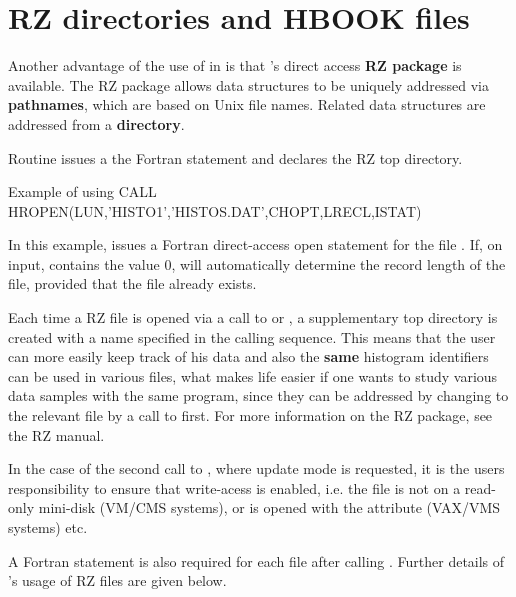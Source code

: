 \newpage
{}
\section{RZ directories and HBOOK files}
%

Another advantage of the use of \ZEBRA{} in \HBOOK{} is that \ZEBRA{}'s direct
access {\bf RZ package} is available.
The RZ package allows data structures to
%
be uniquely addressed via {\bf pathnames}, which are based on
Unix file names.  
Related data structures are addressed from a {\bf directory}. 

Routine  issues a 
the Fortran  statement and declares the
RZ top directory.

\begin{XMPt}{Example of using \protect{}}
      CALL HROPEN(LUN,'HISTO1','HISTOS.DAT',CHOPT,LRECL,ISTAT)
\end{XMPt}

In this example,  issues a Fortran direct-access open
statement for the file . 
If, on input,  contains the value 0,  will
automatically determine the record length of the file, provided
that the file already exists.

Each time a RZ file is opened via a
%
call to  or ,
a supplementary top directory is created with
a name specified in the calling sequence. This
means that the user can more easily keep track of his data
and also the {\bf same} histogram identifiers can be used
in various files, what makes life easier if one wants to study various
data samples with the same program,
since they can be addressed by changing
to the relevant file by a call to  first.
For more information on the RZ package, see the \ZEBRA{} RZ manual.

In the case of the second
call to , where update mode is requested, it is the users
responsibility to ensure that write-acess is enabled, i.e.
the file is not on a read-only mini-disk (VM/CMS systems), or
is opened with the  attribute (VAX/VMS systems) etc.

A Fortran  statement is also required for each file
after calling . 
Further details of \HBOOK's usage of \ZEBRA{} RZ files are given below.

